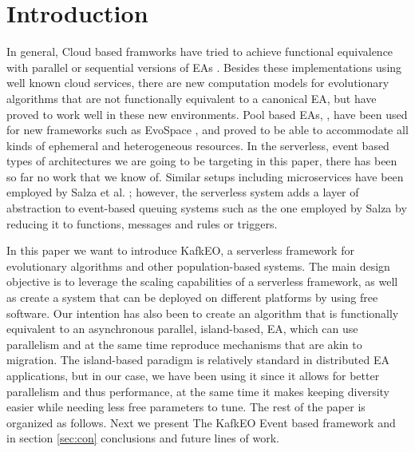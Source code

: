 \documentclass[sigconf]{acmart}
\begin{document}
\maketitle

\section{Introduction}

In general, Cloud based framworks have tried to achieve functional equivalence with parallel or sequential versions of EAs \cite{salza2017ccube,de2017parallel,10.1007/978-3-319-32149-3_46,de2015scalable}. Besides these implementations using well known cloud services, there are new computation models for evolutionary algorithms
that are not functionally equivalent to a canonical EA, but have
proved to work well in these new environments. Pool based EAs,
\cite{bollini1999distributed}, have been used for new
frameworks such as EvoSpace \cite{García-Valdez2015}, and proved to be
able to accommodate all kinds of ephemeral and heterogeneous
resources. In the serverless, event based types of architectures we are going to
be targeting in this paper, there has been so far no work that we know
of. Similar setups including microservices have been employed by Salza et
al. \cite{salza2017ccube}; however, the serverless system adds a layer
of abstraction to event-based queuing systems such as the one employed
by Salza by reducing it to functions, messages and rules or
triggers.

In this paper we want to introduce KafkEO, a serverless framework for
evolutionary algorithms and other population-based systems. The main
design objective is to leverage the scaling capabilities of a
serverless framework, as well as create a system that can be deployed
on different platforms by using free software. Our intention has
also been to create an algorithm that is functionally equivalent to an asynchronous parallel, island-based, EA, which can use parallelism and at the same time reproduce mechanisms that are akin to migration. The island-based
paradigm is relatively standard in distributed EA applications, but in our case,
we have been using it since it allows for better parallelism
and thus performance, at the same time it makes keeping diversity
easier while needing less free parameters to tune.
The rest of the paper is organized as follows. Next we present The KafkEO Event based framework and in section \ref{sec:con} conclusions
and future lines of work.
\end{document}
